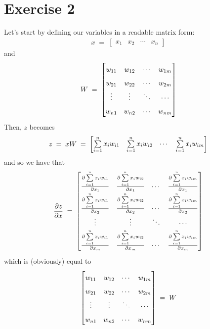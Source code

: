 \documentclass[12pt]{report}
\begin{document}
\section*{Exercise 2}
Let's start by defining our variables in a readable matrix form:
\begin{align*}
    x \;=\;
    \begin{bmatrix}
        x_1 & x_2 & \cdots & x_n
    \end{bmatrix}
\end{align*}
and
\begin{align*}
    W \;=\;
    \renewcommand\arraystretch{1.65}
    \begin{bmatrix}
        w_{11} & w_{12} & \cdots & w_{1m} \\
        w_{21} & w_{22} & \cdots & w_{2m} \\
        \vdots & \vdots & \ddots & \cdots \\
        w_{n1} & w_{n2} & \cdots & w_{nm}
    \end{bmatrix}
\end{align*}
Then, $z$ becomes
\begin{align*}
    z \;=\; xW \;=\;
    \renewcommand\arraystretch{1.65}
    \begin{bmatrix}
        \sum\limits_{i=1}^n x_iw_{i1} & \sum\limits_{i=1}^n x_iw_{i2}
                                      & \cdots & \sum\limits_{i=1}^n x_iw_{im}
    \end{bmatrix}
\end{align*}
and so we have that
\begin{align*}
    \frac{\partial z}{\partial x} \;=\;
    \renewcommand\arraystretch{1.8}
    \begin{bmatrix}
        \frac{\partial \sum\limits_{i=1}^n x_iw_{i1}}{\partial x_1} &
        \frac{\partial \sum\limits_{i=1}^n x_iw_{i2}}{\partial x_1} &
        \cdots &
        \frac{\partial \sum\limits_{i=1}^n x_iw_{im}}{\partial x_1} \\
        \frac{\partial \sum\limits_{i=1}^n x_iw_{i1}}{\partial x_2} &
        \frac{\partial \sum\limits_{i=1}^n x_iw_{i2}}{\partial x_2} &
        \cdots &
        \frac{\partial \sum\limits_{i=1}^n x_iw_{im}}{\partial x_2} \\
        \vdots & \vdots & \ddots & \cdots \\
        \frac{\partial \sum\limits_{i=1}^n x_iw_{i1}}{\partial x_m} &
        \frac{\partial \sum\limits_{i=1}^n x_iw_{i2}}{\partial x_m} &
        \cdots &
        \frac{\partial \sum\limits_{i=1}^n x_iw_{im}}{\partial x_m} \\
    \end{bmatrix}
\end{align*}
which is (obviously) equal to
\begin{align*}
    \renewcommand\arraystretch{1.65}
    \begin{bmatrix}
        w_{11} & w_{12} & \cdots & w_{1m} \\
        w_{21} & w_{22} & \cdots & w_{2m} \\
        \vdots & \vdots & \ddots & \cdots \\
        w_{n1} & w_{n2} & \cdots & w_{nm}
    \end{bmatrix}
    \;=\; W
\end{align*}
\end{document}
